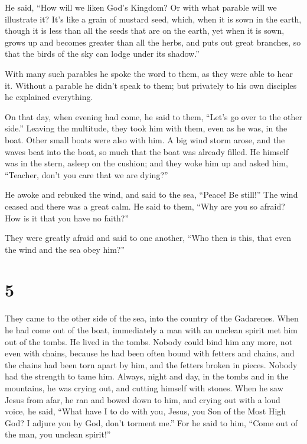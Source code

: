  He said, ``How will we liken God's Kingdom? Or with what
parable will we illustrate it?  It's like a grain of
mustard seed, which, when it is sown in the earth, though it is less
than all the seeds that are on the earth,  yet when it is
sown, grows up and becomes greater than all the herbs, and puts out
great branches, so that the birds of the sky can lodge under its
shadow.''

 With many such parables he spoke the word to them, as they
were able to hear it.  Without a parable he didn't speak to
them; but privately to his own disciples he explained everything.

 On that day, when evening had come, he said to them,
``Let's go over to the other side.''  Leaving the
multitude, they took him with them, even as he was, in the boat. Other
small boats were also with him.  A big wind storm arose,
and the waves beat into the boat, so much that the boat was already
filled.  He himself was in the stern, asleep on the
cushion; and they woke him up and asked him, ``Teacher, don't you care
that we are dying?''

 He awoke and rebuked the wind, and said to the sea,
``Peace! Be still!'' The wind ceased and there was a great calm.
 He said to them, ``Why are you so afraid? How is it that
you have no faith?''

 They were greatly afraid and said to one another, ``Who
then is this, that even the wind and the sea obey him?''

\hypertarget{section-4}{%
\section{5}\label{section-4}}

 They came to the other side of the sea, into the country of
the Gadarenes.  When he had come out of the boat,
immediately a man with an unclean spirit met him out of the tombs.
 He lived in the tombs. Nobody could bind him any more, not
even with chains,  because he had been often bound with
fetters and chains, and the chains had been torn apart by him, and the
fetters broken in pieces. Nobody had the strength to tame him.
 Always, night and day, in the tombs and in the mountains,
he was crying out, and cutting himself with stones.  When he
saw Jesus from afar, he ran and bowed down to him,  and
crying out with a loud voice, he said, ``What have I to do with you,
Jesus, you Son of the Most High God? I adjure you by God, don't torment
me.''  For he said to him, ``Come out of the man, you
unclean spirit!''

